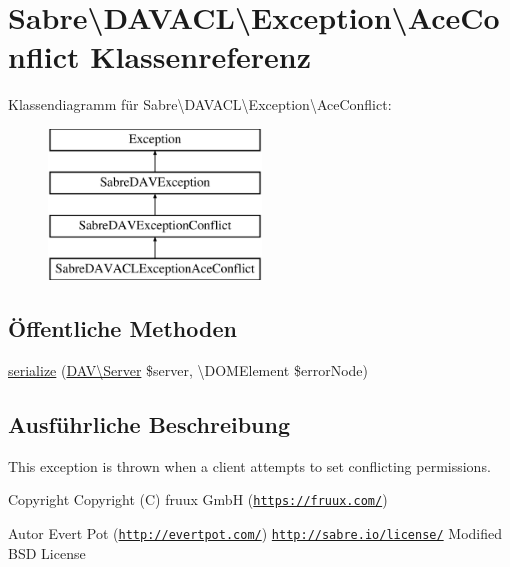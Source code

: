 \hypertarget{class_sabre_1_1_d_a_v_a_c_l_1_1_exception_1_1_ace_conflict}{}\section{Sabre\textbackslash{}D\+A\+V\+A\+CL\textbackslash{}Exception\textbackslash{}Ace\+Conflict Klassenreferenz}
\label{class_sabre_1_1_d_a_v_a_c_l_1_1_exception_1_1_ace_conflict}
Klassendiagramm für Sabre\textbackslash{}D\+A\+V\+A\+CL\textbackslash{}Exception\textbackslash{}Ace\+Conflict\+:\begin{figure}[H]
\begin{center}
\leavevmode
\includegraphics[height=4.000000cm]{class_sabre_1_1_d_a_v_a_c_l_1_1_exception_1_1_ace_conflict}
\end{center}
\end{figure}
\subsection*{Öffentliche Methoden}
\begin{DoxyCompactItemize}
\item 
\mbox{\hyperlink{class_sabre_1_1_d_a_v_a_c_l_1_1_exception_1_1_ace_conflict_a8626c39b03d6f0aced55bac7113ac925}{serialize}} (\mbox{\hyperlink{class_sabre_1_1_d_a_v_1_1_server}{D\+A\+V\textbackslash{}\+Server}} \$server, \textbackslash{}D\+O\+M\+Element \$error\+Node)
\end{DoxyCompactItemize}


\subsection{Ausführliche Beschreibung}
This exception is thrown when a client attempts to set conflicting permissions.

\begin{DoxyCopyright}{Copyright}
Copyright (C) fruux GmbH (\href{https://fruux.com/}{\tt https\+://fruux.\+com/}) 
\end{DoxyCopyright}
\begin{DoxyAuthor}{Autor}
Evert Pot (\href{http://evertpot.com/}{\tt http\+://evertpot.\+com/})  \href{http://sabre.io/license/}{\tt http\+://sabre.\+io/license/} Modified B\+SD License 
\end{DoxyAuthor}


